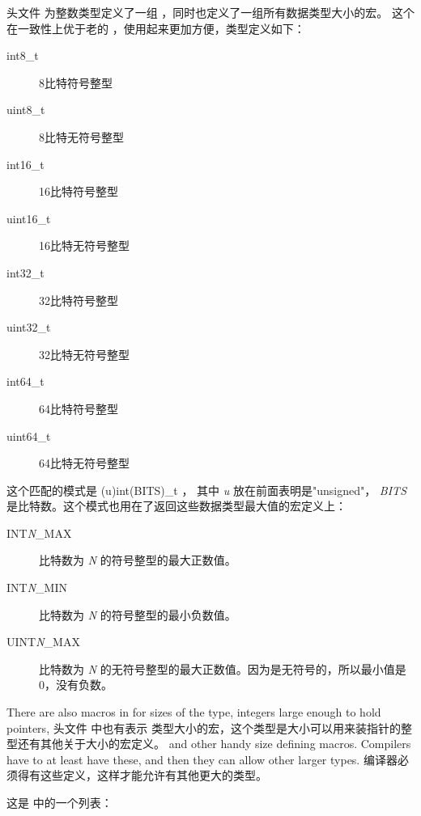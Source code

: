 头文件  为整数类型定义了一组  ，同时也定义了一组所有数据类型大小的宏。 这个在一致性上优于老的  ，使用起来更加方便，类型定义如下：

\begin{description}
\item[int8\_t] 8比特符号整型
\item[uint8\_t] 8比特无符号整型
\item[int16\_t] 16比特符号整型
\item[uint16\_t] 16比特无符号整型
\item[int32\_t] 32比特符号整型
\item[uint32\_t] 32比特无符号整型
\item[int64\_t] 64比特符号整型
\item[uint64\_t] 64比特无符号整型
\end{description}

这个匹配的模式是 (u)int(BITS)\_t ， 其中 \emph{u} 放在前面表明是"unsigned"，  \emph{BITS} 是比特数。这个模式也用在了返回这些数据类型最大值的宏定义上：

\begin{description}
\item[INT\emph{N}\_MAX] 比特数为 \emph{N} 的符号整型的最大正数值。
\item[INT\emph{N}\_MIN] 比特数为 \emph{N} 的符号整型的最小负数值。
\item[UINT\emph{N}\_MAX] 比特数为 \emph{N} 的无符号整型的最大正数值。因为是无符号的，所以最小值是0，没有负数。
\end{description}

There are also macros in  for sizes of the  type, integers large enough to hold pointers,
头文件  中也有表示  类型大小的宏，这个类型是大小可以用来装指针的整型还有其他关于大小的宏定义。
and other handy size defining macros.  Compilers have to at least have these, and then they can allow
other larger types.
编译器必须得有这些定义，这样才能允许有其他更大的类型。


这是 中的一个列表：

